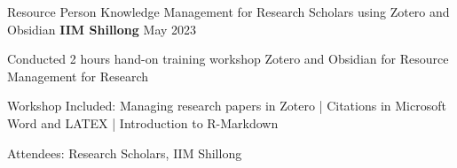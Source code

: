 \begin{cventries}
\cventry
{Resource Person} %
{Knowledge Management for Research Scholars using Zotero and Obsidian} %
{\textbf{IIM Shillong}} %
{May 2023} %
{ %
\begin{cvitems}
\item {Conducted 2 hours hand-on training workshop Zotero and Obsidian for Resource Management for Research}
\item {Workshop Included: Managing research papers in Zotero | Citations in Microsoft Word and LATEX | Introduction to R-Markdown}
\item {Attendees: Research Scholars, IIM Shillong}
\end{cvitems}
}

\end{cventries}